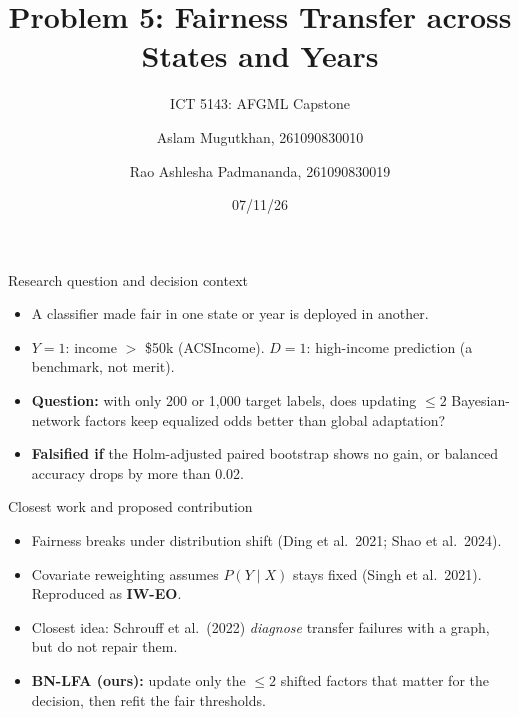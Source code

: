 \documentclass[aspectratio=169,11pt]{beamer}
\title[AFGML Capstone]{Problem 5: Fairness Transfer across States and Years}
\subtitle{ICT 5143: AFGML Capstone}
\author{Aslam Mugutkhan, 261090830010 \and Rao Ashlesha Padmananda, 261090830019}
\date{07/11/26}
\begin{document}
\begin{frame}\titlepage\end{frame}

\begin{frame}{Research question and decision context}
\begin{itemize}[<+->]
\item A classifier made fair in one state or year is deployed in another.
\item $Y=1$: income $>$ \$50k (ACSIncome). $D=1$: high-income prediction (a benchmark, not merit).
\item \textbf{Question:} with only 200 or 1,000 target labels, does updating $\le 2$ Bayesian-network factors keep
equalized odds better than global adaptation?
\item \textbf{Falsified if} the Holm-adjusted paired bootstrap shows no gain, or balanced accuracy drops by more than
0.02.
\end{itemize}
\end{frame}

\begin{frame}{Closest work and proposed contribution}
\begin{itemize}[<+->]
\item Fairness breaks under distribution shift (Ding et al.\ 2021; Shao et al.\ 2024).
\item Covariate reweighting assumes $P(Y\mid X)$ stays fixed (Singh et al.\ 2021). Reproduced as \textbf{IW-EO}.
\item Closest idea: Schrouff et al.\ (2022) \emph{diagnose} transfer failures with a graph, but do not repair them.
\item \textbf{BN-LFA (ours):} update only the $\le 2$ shifted factors that matter for the decision, then refit the
fair thresholds.
\end{itemize}
\end{frame}
\end{document}
